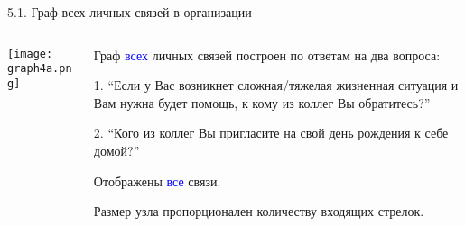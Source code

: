 \begin{frame}{5.1. Граф всех личных связей в организации}

\begin{columns}
\begin{column}{0.75\textwidth} 
\centering
          \texttt{[image: graph4a.png]}
\end{column}
\begin{column}{0.25\textwidth}
\tiny
Граф \textcolor{blue}{всех} личных связей построен по ответам на два вопроса:
\smallskip

1. ``Если у Вас возникнет сложная/тяжелая жизненная ситуация и Вам нужна будет помощь, к кому из коллег Вы обратитесь?''
\smallskip

2. ``Кого из коллег Вы пригласите на свой день рождения к себе домой?''
\smallskip

Отображены \textcolor{blue}{все} связи. 
\smallskip

Размер узла пропорционален количеству входящих стрелок.

\end{column}
\end{columns}
\end{frame}


